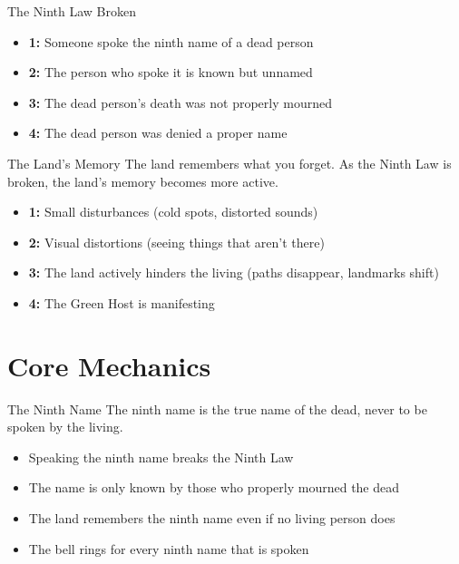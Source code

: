 \documentclass[11pt]{article}
\begin{document}
\begin{mechanicsbox}{The Ninth Law Broken}
\begin{itemize}
    \item \textbf{1:} Someone spoke the ninth name of a dead person
    \item \textbf{2:} The person who spoke it is known but unnamed
    \item \textbf{3:} The dead person's death was not properly mourned
    \item \textbf{4:} The dead person was denied a proper name
\end{itemize}
\end{mechanicsbox}

\begin{mechanicsbox}{The Land's Memory}
The land remembers what you forget. As the Ninth Law is broken, the land's memory becomes more active.
\begin{itemize}
    \item \textbf{1:} Small disturbances (cold spots, distorted sounds)
    \item \textbf{2:} Visual distortions (seeing things that aren't there)
    \item \textbf{3:} The land actively hinders the living (paths disappear, landmarks shift)
    \item \textbf{4:} The Green Host is manifesting
\end{itemize}
\end{mechanicsbox}

\section*{Core Mechanics}

\begin{mechanicsbox}{The Ninth Name}
The ninth name is the true name of the dead, never to be spoken by the living.
\begin{itemize}
    \item Speaking the ninth name breaks the Ninth Law
    \item The name is only known by those who properly mourned the dead
    \item The land remembers the ninth name even if no living person does
    \item The bell rings for every ninth name that is spoken
\end{itemize}
\end{mechanicsbox}
\end{document}
